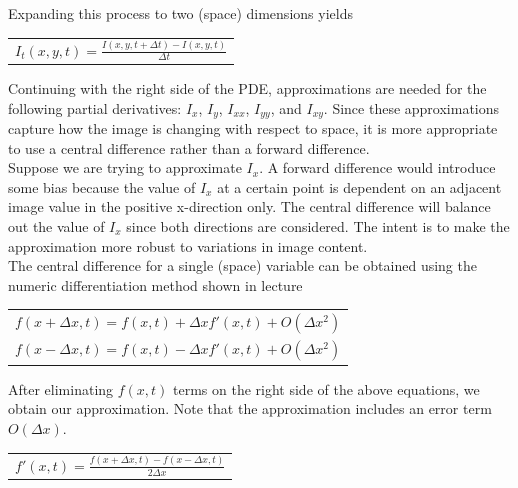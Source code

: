 \documentclass{article}
\begin{document}
  \noindent
  Expanding this process to two (space) dimensions yields
  \begin{center}
    \begin{tabular}{l}
      $I_{t}(x,y,t) = \frac{I(x,y,t+\Delta t) - I(x,y,t)}{\Delta t}$\\
    \end{tabular}
  \end{center}
  \vspace{12pt}

  \noindent
  Continuing with the right side of the PDE, approximations are needed for the following partial
  derivatives: $I_{x}$, $I_{y}$, $I_{xx}$, $I_{yy}$, and $I_{xy}$. Since these approximations
  capture how the image is changing with respect to space, it is more appropriate to use a
  central difference rather than a forward difference.\\
  
  \noindent
  Suppose we are trying to approximate
  $I_{x}$. A forward difference would introduce some bias because the value of $I_{x}$ at
  a certain point is dependent on an adjacent image value in the positive x-direction only.
  The central difference will balance out the value of $I_{x}$ since both directions
  are considered. The intent is to make the approximation more robust to variations in image content.\\

  \newpage
  \noindent
  The central difference for a single (space) variable can be obtained using the
  numeric differentiation method shown in lecture
  \begin{center}
    \begin{tabular}{l}
      \vspace{12pt}
      $f(x+\Delta x,t) = f(x,t) + \Delta x f'(x,t) + O(\Delta x^2)$\\
      \vspace{12pt}
      $f(x-\Delta x,t) = f(x,t) - \Delta x f'(x,t) + O(\Delta x^2)$\\
    \end{tabular}
  \end{center}

  \noindent
  After eliminating $f(x,t)$ terms on the right side of the above equations,
  we obtain our approximation. Note that the approximation includes an error term $O(\Delta x)$.
  \begin{center}
    \begin{tabular}{l}
      \vspace{12pt}
      $f'(x,t) = \frac{f(x+\Delta x,t) - f(x-\Delta x,t)}{2\Delta x}$\\
    \end{tabular}
  \end{center}
\end{document}
